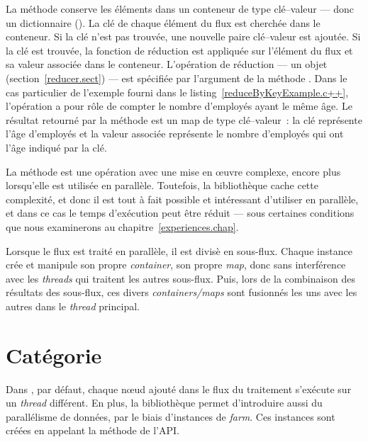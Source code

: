 La m\'ethode  conserve les \'el\'ements dans un conteneur de type cl\'e--valeur --- donc un dictionnaire (). La cl\'e de chaque \'el\'ement du flux est cherch\'ee dans le conteneur. Si la cl\'e n'est pas trouv\'ee, une nouvelle paire cl\'e--valeur est ajout\'ee. Si la cl\'e est trouv\'ee, la fonction de r\'eduction est appliqu\'ee sur l'\'el\'ement du flux et sa valeur associ\'ee dans le conteneur. L'op\'eration de r\'eduction --- un objet  (section~\ref{reducer.sect})  --- est sp\'ecifi\'ee par l'argument de la m\'ethode . Dans le cas particulier de l'exemple fourni dans le listing~\ref{reduceByKeyExample.c++}, l'op\'eration a pour r\^ole de compter le nombre d'employ\'es ayant le m\^eme \^age. Le r\'esultat retourn\'e par la m\'ethode  est un map de type cl\'e--valeur~: la cl\'e repr\'esente l'\^age d'employ\'es et la valeur associ\'ee repr\'esente le nombre d'employ\'es qui ont l'\^age indiqu\'e par la cl\'e.

La m\'ethode  est une op\'eration avec une mise en \oe{}uvre complexe, encore plus lorsqu'elle est utilis\'ee en parall\`ele. Toutefois, la biblioth\`eque  cache cette complexit\'e, et donc il est tout à fait possible et intéressant d'utiliser  en parall\`ele, et dans ce cas le temps d'ex\'ecution peut être réduit --- sous certaines conditions que nous examinerons au chapitre~\ref{experiences.chap}.


Lorsque le flux est trait\'e en parall\`ele, il est divis\`e en sous-flux. Chaque instance cr\'ee et manipule son propre \emph{container}, son propre \emph{map}, donc sans interf\'erence avec les \emph{threads} qui traitent les autres sous-flux. Puis, lors de la combinaison des r\'esultats des sous-flux, ces divers \emph{containers/maps} sont fusionn\'es les uns avec les autres dans le \emph{thread} principal.


\section{Cat\'egorie }

\label{execution.sect}


Dans , par d\'efaut, chaque nœud ajout\'e dans le flux du traitement s'ex\'ecute sur un \emph{thread} diff\'erent. En plus, la biblioth\`eque  permet d'introduire aussi du parall\'elisme de données, par le biais d'instances de \emph{farm}. Ces instances sont cr\'e\'ees en appelant la m\'ethode  de l’API.  

